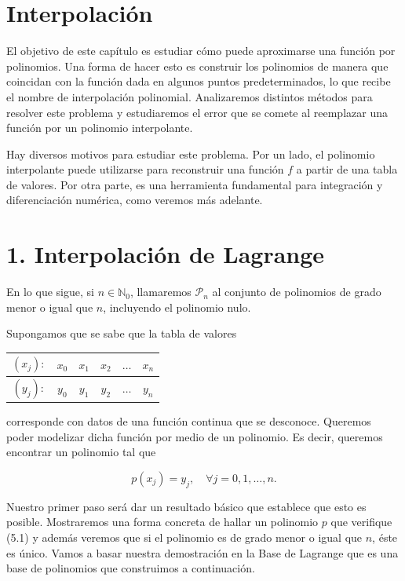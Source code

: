 \documentclass[10pt]{article}
\begin{document}
\section*{Interpolación}
El objetivo de este capítulo es estudiar cómo puede aproximarse una función por polinomios. Una forma de hacer esto es construir los polinomios de manera que coincidan con la función dada en algunos puntos predeterminados, lo que recibe el nombre de interpolación polinomial. Analizaremos distintos métodos para resolver este problema y estudiaremos el error que se comete al reemplazar una función por un polinomio interpolante.

Hay diversos motivos para estudiar este problema. Por un lado, el polinomio interpolante puede utilizarse para reconstruir una función $f$ a partir de una tabla de valores. Por otra parte, es una herramienta fundamental para integración y diferenciación numérica, como veremos más adelante.

\section*{1. Interpolación de Lagrange}
En lo que sigue, si $n \in \mathbb{N}_{0}$, llamaremos $\mathcal{P}_{n}$ al conjunto de polinomios de grado menor o igual que $n$, incluyendo el polinomio nulo.

Supongamos que se sabe que la tabla de valores

\begin{center}
\begin{tabular}{|c||c|c|c|c|c|}
\hline
$\left(x_{j}\right):$ & $x_{0}$ & $x_{1}$ & $x_{2}$ & $\ldots$ & $x_{n}$ \\
\hline
$\left(y_{j}\right):$ & $y_{0}$ & $y_{1}$ & $y_{2}$ & $\ldots$ & $y_{n}$ \\
\hline
\end{tabular}
\end{center}

corresponde con datos de una función continua que se desconoce. Queremos poder modelizar dicha función por medio de un polinomio. Es decir, queremos encontrar un polinomio tal que


\begin{equation*}
p\left(x_{j}\right)=y_{j}, \quad \forall j=0,1, \ldots, n . \tag{5.1}
\end{equation*}


Nuestro primer paso será dar un resultado básico que establece que esto es posible. Mostraremos una forma concreta de hallar un polinomio $p$ que verifique (5.1) y además veremos que si el polinomio es de grado menor o igual que $n$, éste es único. Vamos a basar nuestra demostración en la Base de Lagrange que es una base de polinomios que construimos a continuación.
\end{document}
